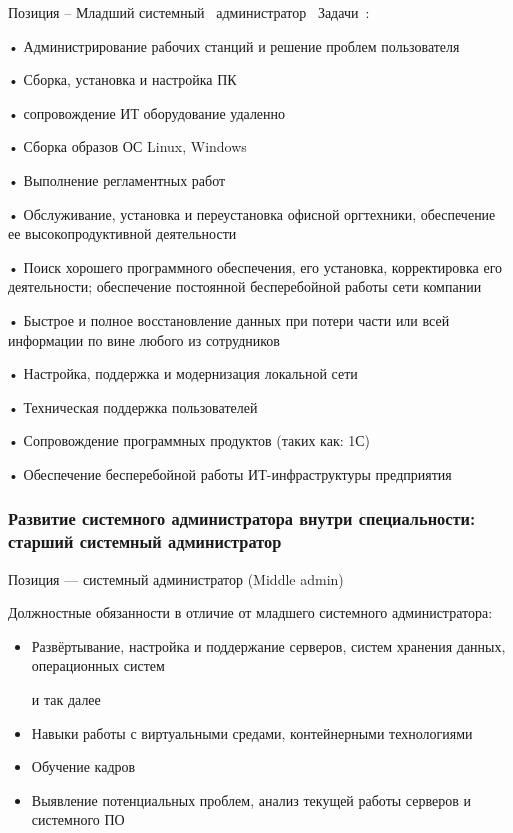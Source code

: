 \documentclass{../industrial-development}
\begin{document}
\lecturenotes

Позиция – Младший системный~\cite{hh} администратор~\cite{itcf}
Задачи~\cite{rab}:

•	Администрирование рабочих станций и решение проблем пользователя

•	Сборка, установка и настройка ПК

•	сопровождение ИТ оборудование удаленно

•	Сборка образов ОС Linux, Windows

•	Выполнение регламентных работ

•	Обслуживание, установка и переустановка офисной оргтехники, обеспечение ее высокопродуктивной деятельности

•	Поиск хорошего программного обеспечения, его установка, корректировка его деятельности; обеспечение постоянной бесперебойной работы сети компании

•	Быстрое и полное восстановление данных при потери части или всей информации по вине любого из сотрудников

•	Настройка, поддержка и модернизация локальной сети

•	Техническая поддержка пользователей

•	Сопровождение программных продуктов (таких как: 1С)

•	Обеспечение бесперебойной работы ИТ-инфраструктуры предприятия

\begin{frame} \frametitle{Развитие системного администратора внутри специальности: старший системный администратор }
 \begin{block}{}
  \alert{Позиция --- системный администратор (Middle admin)}

Должностные обязанности в отличие от младшего системного администратора: 
  \end{block}
  \begin{itemize}
  \item   Развёртывание, настройка и поддержание серверов, систем хранения данных, операционных систем

 и так далее
  \item Навыки работы с виртуальными средами, контейнерными технологиями
  \item Обучение кадров
 \item Выявление потенциальных проблем, анализ текущей работы серверов и системного ПО
  \end{itemize}
\end{frame}
\end{document}
